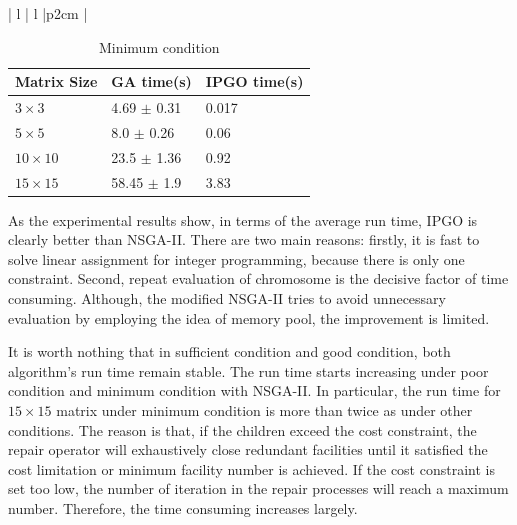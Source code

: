 \documentclass{llncs}
\begin{document}
\begin{table}[!htb]
\begin{minipage}{.5\linewidth}
\begin{tabular}{ | l | l |p{2cm} |}
	\end{tabular}
	\end{minipage}
	\label{table:poor}
\begin{minipage}{.5\linewidth}
	\caption{Minimum condition}
	\begin{tabular}{ | l | l |p{2cm} |}
		\hline
		Matrix Size & GA time(s) & IPGO time(s)\\ \hline
		$3 \times 3$  & 4.69 $\pm$ 0.31 & 0.017\\ \hline
		$5 \times 5$  & 8.0 $\pm$ 0.26 & 0.06 \\ \hline
		$10 \times 10$ &23.5 $\pm$ 1.36 & 0.92\\ \hline
		$15 \times 15$  & 58.45 $\pm$ 1.9 & 3.83\\ \hline
	\end{tabular}
	\end{minipage}
	\label{table:minimum}
\end{table}

As the experimental results show, in terms of the average run time, IPGO is clearly better than NSGA-II. 
There are two main reasons: firstly, it is fast to solve linear assignment for integer programming, because there 
is only one constraint. Second, repeat evaluation of chromosome is the decisive factor of time consuming. 
Although, the modified NSGA-II tries to avoid unnecessary evaluation by employing the idea of memory pool, 
the improvement is limited. 

It is worth nothing that in sufficient condition and good condition, both algorithm's run time remain stable. The run time starts
increasing under poor condition and minimum condition with NSGA-II. In particular, the run time for $15 \times 15$ matrix under 
minimum condition is more than twice as under other conditions.  The reason is that, if the children exceed the cost constraint, 
the repair operator will exhaustively close redundant facilities until it satisfied the cost limitation or minimum facility 
number is achieved. If the cost constraint is set too low, the number of iteration in the repair 
processes will reach a maximum number. Therefore, the time consuming increases largely.
\end{document}
